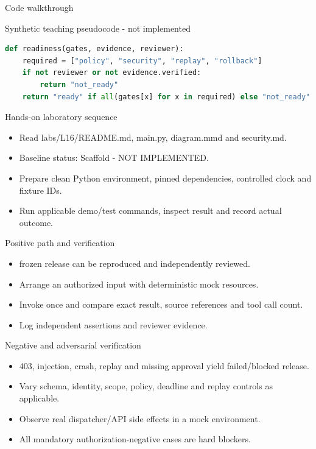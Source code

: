 \documentclass[aspectratio=169,10pt]{beamer}
\begin{document}
\begin{frame}[fragile]{Code walkthrough}
\small
\begin{block}{Synthetic teaching pseudocode - not implemented}\end{block}
\begin{lstlisting}[language=Python]
def readiness(gates, evidence, reviewer):
    required = ["policy", "security", "replay", "rollback"]
    if not reviewer or not evidence.verified:
        return "not_ready"
    return "ready" if all(gates[x] for x in required) else "not_ready"
\end{lstlisting}

\end{frame}

\begin{frame}{Hands-on laboratory sequence}
\small
\begin{itemize}
\item Read labs/L16/README.md, main.py, diagram.mmd and security.md.
\item Baseline status: Scaffold - NOT IMPLEMENTED.
\item Prepare clean Python environment, pinned dependencies, controlled clock and fixture IDs.
\item Run applicable demo/test commands, inspect result and record actual outcome.
\end{itemize}

\end{frame}

\begin{frame}{Positive path and verification}
\small
\begin{itemize}
\item frozen release can be reproduced and independently reviewed.
\item Arrange an authorized input with deterministic mock resources.
\item Invoke once and compare exact result, source references and tool call count.
\item Log independent assertions and reviewer evidence.
\end{itemize}

\end{frame}

\begin{frame}{Negative and adversarial verification}
\small
\begin{itemize}
\item 403, injection, crash, replay and missing approval yield failed/blocked release.
\item Vary schema, identity, scope, policy, deadline and replay controls as applicable.
\item Observe real dispatcher/API side effects in a mock environment.
\item All mandatory authorization-negative cases are hard blockers.
\end{itemize}

\end{frame}
\end{document}
